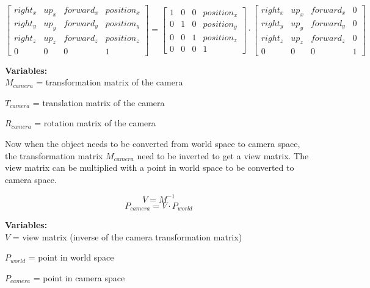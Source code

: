 \[
\begin{bmatrix}
right_{x} & up_{x} & forward_{x} & position_{x} \\
right_{y} & up_{y} & forward_{y} & position_{y} \\
right_{z} & up_{z} & forward_{z} & position_{z} \\
0 & 0 & 0 & 1
\end{bmatrix}
=
\begin{bmatrix}
1 & 0 & 0&position_{x}\\
0&1&0&position_{y}\\
0&0&1&position_{z}\\
0&0&0&1
\end{bmatrix}
\cdot
\begin{bmatrix}
right_{x} & up_{x} & forward_{x} & 0 \\
right_{y} & up_{y} & forward_{y} & 0 \\
right_{z} & up_{z} & forward_{z} & 0 \\
0 & 0 & 0 & 1
\end{bmatrix}
\]

\textbf{Variables:}\\
$M_{camera}$ = transformation matrix of the camera

$T_{camera}$ = translation matrix of the camera\ \cite{Web:08}

$R_{camera}$ = rotation matrix of the camera\ \cite{Web:08}

Now when the object needs to be converted from world space to camera space, the transformation matrix $M_{camera}$ need to be inverted to get a view matrix. The view matrix can be multiplied with a point in world space to be converted to camera space.\ \cite{Web:07}

\[V = M^{-1}\]
\[P_{camera} = V \cdot P_{world}\]

\textbf{Variables: } \\
$V$ = view matrix (inverse of the camera transformation matrix)

$P_{world}$ = point in world space

$P_{camera}$ = point in camera space\\